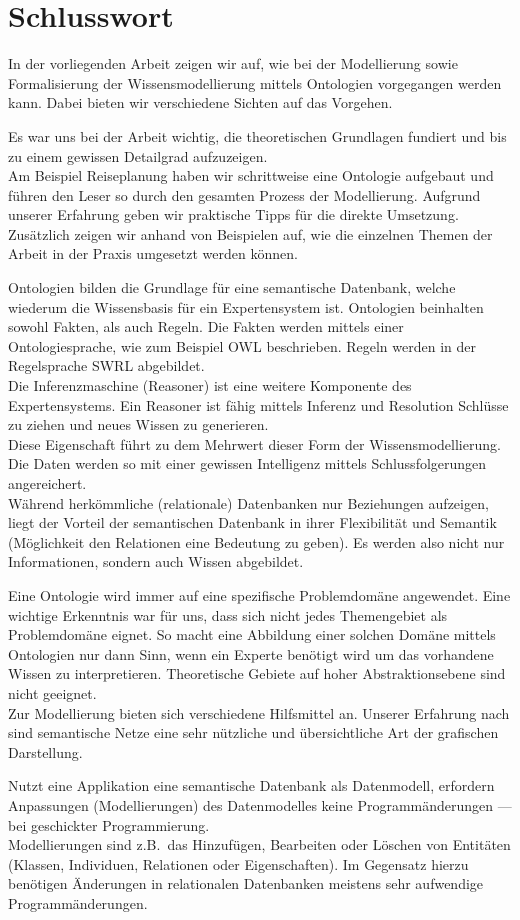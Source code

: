 \chapter{Schlusswort}
\label{chap:schlusswort}

In der vorliegenden Arbeit zeigen wir auf, wie bei der Modellierung sowie Formalisierung der Wissensmodellierung mittels Ontologien vorgegangen werden kann. Dabei bieten wir verschiedene Sichten auf das Vorgehen.

Es war uns bei der Arbeit wichtig, die theoretischen Grundlagen fundiert und bis zu einem gewissen Detailgrad aufzuzeigen. \\
Am Beispiel Reiseplanung haben wir schrittweise eine Ontologie aufgebaut und führen den Leser so durch den gesamten Prozess der Modellierung. Aufgrund unserer Erfahrung geben wir praktische Tipps für die direkte Umsetzung. Zusätzlich zeigen wir anhand von Beispielen auf, wie die einzelnen Themen der Arbeit in der Praxis umgesetzt werden können.

Ontologien bilden die Grundlage für eine semantische Datenbank, welche wiederum die Wissensbasis für ein Expertensystem ist. Ontologien beinhalten sowohl Fakten, als auch Regeln. Die Fakten werden mittels einer Ontologiesprache, wie zum Beispiel OWL beschrieben. Regeln werden in der Regelsprache SWRL abgebildet.\\
Die Inferenzmaschine (Reasoner) ist eine weitere Komponente des Expertensystems. Ein Reasoner ist fähig mittels Inferenz und Resolution Schlüsse zu ziehen und neues Wissen zu generieren.\\
Diese Eigenschaft führt zu dem Mehrwert dieser Form der Wissensmodellierung. Die Daten werden so mit einer gewissen Intelligenz mittels Schlussfolgerungen angereichert.\\
Während herkömmliche (relationale) Datenbanken nur Beziehungen aufzeigen, liegt der Vorteil der semantischen Datenbank in ihrer Flexibilität und Semantik (Möglichkeit den Relationen eine Bedeutung zu geben). Es werden also nicht nur Informationen, sondern auch Wissen abgebildet.

Eine Ontologie wird immer auf eine spezifische Problemdomäne angewendet. Eine wichtige Erkenntnis war für uns, dass sich nicht jedes Themengebiet als Problemdomäne eignet. So macht eine Abbildung einer solchen Domäne mittels Ontologien nur dann Sinn, wenn ein Experte benötigt wird um das vorhandene Wissen zu interpretieren.
Theoretische Gebiete auf hoher Abstraktionsebene sind nicht geeignet.\\
Zur Modellierung bieten sich verschiedene Hilfsmittel an. Unserer Erfahrung nach sind semantische Netze eine sehr nützliche und übersichtliche Art der grafischen Darstellung.

Nutzt eine Applikation eine semantische Datenbank als Datenmodell, erfordern Anpassungen (Modellierungen) des Datenmodelles keine Programmänderungen --- bei geschickter Programmierung.\\
Modellierungen sind z.B.\ das Hinzufügen, Bearbeiten oder Löschen von Entitäten (Klassen, Individuen, Relationen oder Eigenschaften).
Im Gegensatz hierzu benötigen Änderungen in relationalen Datenbanken meistens sehr aufwendige Programmänderungen.
